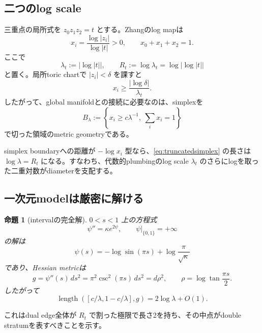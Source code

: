 \documentclass[11pt,a4paper]{ltjsarticle}
\newtheorem{proposition}[theorem]{命題}
\theoremstyle{definition}
\theoremstyle{remark}
\begin{document}
\subsection{二つのlog scale}

三重点の局所式を $z_0z_1z_2=t$ とする。Zhangのlog mapは
\begin{equation}\label{eq:logmap}
 x_i=\frac{\log|z_i|}{\log|t|}>0,
 \qquad x_0+x_1+x_2=1.
\end{equation}
ここで
\begin{equation}\label{eq:scales}
 \lambda_t:=|\log|t||,\qquad R_t:=\log\lambda_t=\log|\log|t||
\end{equation}
と置く。局所toric chartで $|z_i|<\delta$ を課すと
\[
 x_i\geq \frac{|\log\delta|}{\lambda_t}.
\]
したがって、global manifoldとの接続に必要なのは、simplexを
\begin{equation}\label{eq:truncatedsimplex}
 B_{\lambda}:=\left\{x_i\geq c\lambda^{-1},\ \sum_i x_i=1\right\}
\end{equation}
で切った領域のmetric geometryである。

simplex boundaryへの距離が $-\log x_i$ 型なら、\eqref{eq:truncatedsimplex} の長さは
$\log\lambda=R_t$ になる。すなわち、代数的plumbingのlog scale $\lambda_t$ のさらにlogを取った二重対数がdiameterを支配する。

\subsection{一次元modelは厳密に解ける}

\begin{proposition}[intervalの完全解]\label{prop:1d}
$0<s<1$ 上の方程式
\[
 \psi''=\kappa e^{2\psi},\qquad \psi|_{\{0,1\}}=+\infty
\]
の解は
\begin{equation}\label{eq:1dsolution}
 \psi(s)=-\log\sin(\pi s)+\log\frac{\pi}{\sqrt\kappa}
\end{equation}
であり、Hessian metricは
\begin{equation}\label{eq:1dmetric}
 g=\psi''(s)\,ds^2
 =\pi^2\csc^2(\pi s)\,ds^2
 =d\rho^2,
 \qquad
 \rho=\log\tan\frac{\pi s}{2}.
\end{equation}
したがって
\begin{equation}\label{eq:intervaldiam}
 \operatorname{length}\left([c/\lambda,1-c/\lambda],g\right)
 =2\log\lambda+O(1).
\end{equation}
\end{proposition}

これはdual edge全体が $R_t$ で割った極限で長さ2を持ち、その中点がdouble stratumを表すべきことを示す。
\end{document}
